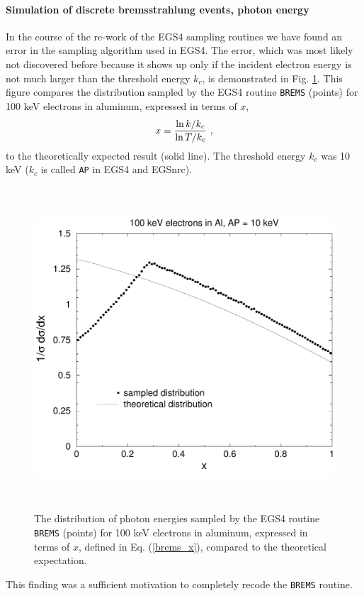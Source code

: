 \paragraph{Simulation of discrete bremsstrahlung events, photon energy}
\hfill
{}


In the course of the re-work of the EGS4 sampling routines
we have found an error in the sampling algorithm used in
EGS4. The error, which was most likely not discovered before
because it shows up only if the incident electron energy is
not much larger than the threshold energy $k_c$, is
demonstrated in Fig. \ref{brems_fig2}. This figure compares the distribution
sampled by the EGS4 routine {\tt BREMS} (points) for 100 keV
electrons in aluminum, expressed in
terms of $x$,
\begin{equation}
\label{brems_x}
x = {\ln k/k_c \over \ln T/k_c}~,
\end{equation}
to the theoretically expected result (solid line). The threshold
energy $k_c$ was 10 keV ($k_c$ is called {\tt AP} in EGS4 and EGSnrc).
\begin{figure}[htp]
\includegraphics[height=12cm,width=12cm]{figures/Al_100keV}
\caption[{\tt BREMS} bug in EGS4]{\label{brems_fig2}
The distribution of photon energies
sampled by the EGS4 routine {\tt BREMS} (points) for 100 keV
electrons in aluminum, expressed in terms of $x$, defined in
Eq. (\protect\ref{brems_x}), compared to the theoretical
expectation.}
\end{figure}
This finding was a sufficient motivation to completely recode
the {\tt BREMS} routine.

